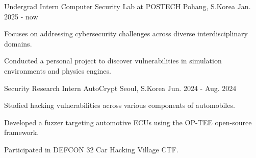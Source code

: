 

\begin{cventries}

  \cventry
    {Undergrad Intern} %
    {Computer Security Lab at POSTECH} %
    {Pohang, S.Korea} %
    {Jan. 2025 - now} %
    {
      \begin{cvitems} %
        \item {Focuses on addressing cybersecurity challenges across diverse interdisciplinary domains.}
        \item {Conducted a personal project to discover vulnerabilities in simulation environments and physics engines.}   
      \end{cvitems}
    }
  \cventry
    {Security Research Intern} %
    {AutoCrypt} %
    {Seoul, S.Korea} %
    {Jun. 2024 - Aug. 2024} %
    {
      \begin{cvitems} %
        \item {Studied hacking vulnerabilities across various components of automobiles.}
        \item {Developed a fuzzer targeting automotive ECUs using the OP-TEE open-source framework.}
        \item {Participated in DEFCON 32 Car Hacking Village CTF.}
      \end{cvitems}
    }
\end{cventries}
